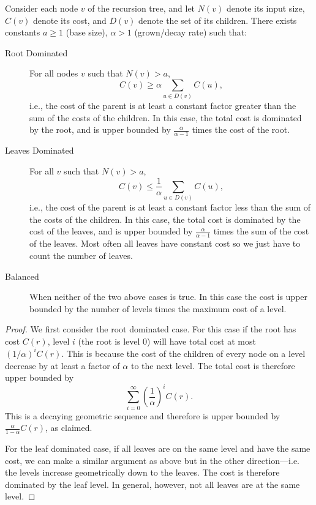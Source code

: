\begin{flex}
\begin{definition}
\label{def:analysis::brick-method}
Consider each node $v$ of the recursion tree, and let $N(v)$ denote  
its input size, $C(v)$ denote its cost, and $D(v)$ denote the set of
its children.   There exists constants $a \geq 1$ (base size), $\alpha
> 1$ (grown/decay rate) such that:

\begin{description}

\item[Root Dominated]
For all nodes $v$ such that $N(v) > a$,
\[C(v) \geq \alpha \sum_{u \in D(v)} C(u),\]
i.e., the cost of the parent is at least a
constant factor greater than the sum of the 
costs of the children.  In this case, the total cost is dominated by
the root, and is upper bounded 
by $\frac{\alpha}{\alpha - 1}$ times the cost of the root. 

\item[Leaves Dominated]
For all $v$ such that $N(v) > a$, 
\[C(v) \leq \frac{1}{\alpha} \sum_{u \in D(v)} C(u),\]
i.e., the cost of the parent is at least a
constant factor less than the sum of the costs of the 
children.   In this case,
the total cost is dominated by the cost of the leaves, and is upper bounded by $\frac{\alpha}{\alpha - 1}$ times the
sum of the cost of the leaves.
Most often all leaves have constant cost so we just have to count the
number of leaves.

\item[Balanced]
When neither of the two above cases is true.     In this case the cost
is upper bounded by the number of levels times the maximum cost of a
level.
\end{description}
\end{definition}
\begin{proof}
  We first consider the root dominated case.  For this case if the
  root has cost $C(r)$, level $i$ (the root is level $0$) will have
  total cost at most $(1/\alpha)^i C(r)$.  
%
  This is because the cost of the children of every node on a level
  decrease by at least a factor of $\alpha$ to the next level.  
%
  The total cost is therefore upper bounded by
  \[ \sum_{i=0}^{\infty} \left(\frac{1}{\alpha}\right)^i C(r).   \]
%
  This is a decaying geometric sequence and therefore is upper bounded
  by $\frac{\alpha}{1 - \alpha} C(r)$, as claimed.

  For the leaf dominated case, if all leaves are on the same level and
  have the same cost, we can make a
  similar argument as above but in the other direction---i.e. the
  levels increase geometrically down to the leaves.    The cost is
  therefore dominated by the leaf level.
%
  In general, however, not all leaves are at the same level.


\end{proof}
\end{flex}
